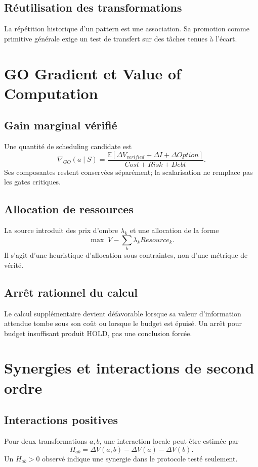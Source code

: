 \section{Réutilisation des transformations}
La répétition historique d'un pattern est une association. Sa promotion comme primitive générale exige un test de transfert sur des tâches tenues à l'écart.

\chapter{GO Gradient et Value of Computation}
\section{Gain marginal vérifié}
Une quantité de scheduling candidate est
\[
\nabla_{GO}(a\mid S)=\frac{\mathbb E[\Delta V_{verified}+\Delta I+\Delta Option]}{Cost+Risk+Debt}.
\]
Ses composantes restent conservées séparément; la scalarisation ne remplace pas les gates critiques.

\section{Allocation de ressources}
La source introduit des prix d'ombre $\lambda_k$ et une allocation de la forme
\[
\max\;V-\sum_k\lambda_k Resource_k.
\]
Il s'agit d'une heuristique d'allocation sous contraintes, non d'une métrique de vérité.

\section{Arrêt rationnel du calcul}
Le calcul supplémentaire devient défavorable lorsque sa valeur d'information attendue tombe sous son coût ou lorsque le budget est épuisé. Un arrêt pour budget insuffisant produit HOLD, pas une conclusion forcée.

\chapter{Synergies et interactions de second ordre}
\section{Interactions positives}
Pour deux transformations $a,b$, une interaction locale peut être estimée par
\[
H_{ab}=\Delta V(a,b)-\Delta V(a)-\Delta V(b).
\]
Un $H_{ab}>0$ observé indique une synergie dans le protocole testé seulement.

